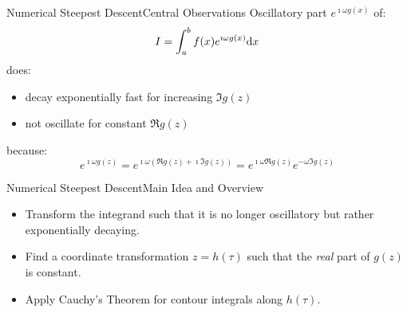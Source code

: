 \documentclass{beamer}
\newcommand{\cemph}[1]{\emph{\color{orange} #1}}
\begin{document}
\begin{frame}{Numerical Steepest Descent}{Central Observations}
  Oscillatory part $e^{\imath \omega g(x)}$ of:
  \begin{equation*}
    I = \int_a^b f(x) e^{\imath \omega g(x)} \mathrm{d}x
  \end{equation*}
  does:
  \begin{itemize}
    \item decay exponentially fast for increasing $\Im g(z)$
    \item not oscillate for constant $\Re g(z)$
  \end{itemize}
  because:
  \begin{equation*}
    e^{\imath \omega g(z)}
    =
    e^{\imath \omega (\Re g(z) + \imath \Im g(z))}
    =
    e^{\imath \omega \Re g(z)}
    e^{- \omega \Im g(z)}
  \end{equation*}
\end{frame}


\begin{frame}{Numerical Steepest Descent}{Main Idea and Overview}
  \begin{itemize}
    \item Transform the integrand such that it is no longer oscillatory but rather exponentially decaying.
  \end{itemize}
  \vspace{1cm}
  \begin{itemize}
    \item Find a coordinate transformation $z = h(\tau)$ such that the \cemph{real} part
          of $g(z)$ is constant.
    \item Apply Cauchy's Theorem for contour integrals along $h(\tau)$.
  \end{itemize}
\end{frame}
\end{document}
